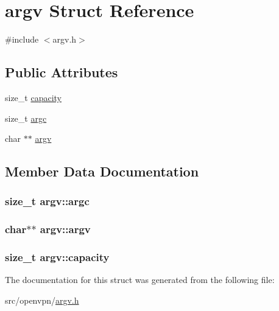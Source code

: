 \hypertarget{structargv}{}\section{argv Struct Reference}
\label{structargv}


{\ttfamily \#include $<$argv.\+h$>$}

\subsection*{Public Attributes}
\begin{DoxyCompactItemize}
\item 
size\+\_\+t \hyperlink{structargv_ac74a6705001b8b3e69326f7a27d29146}{capacity}
\item 
size\+\_\+t \hyperlink{structargv_a8b168ac1cfb382ffe6f0ca62f70755d3}{argc}
\item 
char $\ast$$\ast$ \hyperlink{structargv_a3fa35902580e368d0b0c875af2a8e696}{argv}
\end{DoxyCompactItemize}


\subsection{Member Data Documentation}
\hypertarget{structargv_a8b168ac1cfb382ffe6f0ca62f70755d3}{}
\subsubsection[{argc}]{\setlength{\rightskip}{0pt plus 5cm}size\+\_\+t argv\+::argc}\label{structargv_a8b168ac1cfb382ffe6f0ca62f70755d3}
\hypertarget{structargv_a3fa35902580e368d0b0c875af2a8e696}{}
\subsubsection[{argv}]{\setlength{\rightskip}{0pt plus 5cm}char$\ast$$\ast$ argv\+::argv}\label{structargv_a3fa35902580e368d0b0c875af2a8e696}
\hypertarget{structargv_ac74a6705001b8b3e69326f7a27d29146}{}
\subsubsection[{capacity}]{\setlength{\rightskip}{0pt plus 5cm}size\+\_\+t argv\+::capacity}\label{structargv_ac74a6705001b8b3e69326f7a27d29146}


The documentation for this struct was generated from the following file\+:\begin{DoxyCompactItemize}
\item 
src/openvpn/\hyperlink{argv_8h}{argv.\+h}\end{DoxyCompactItemize}
